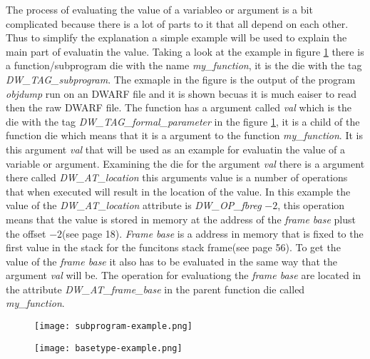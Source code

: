  


The process of evaluating the value of a variableo or argument is a bit complicated because there is a lot of parts to it that all depend on each other.
Thus to simplify the explanation a simple example will be used to explain the main part of evaluatin the value.
Taking a look at the example in figure \ref{fig:subprogramexample} there is a function/subprogram die with the name \emph{my\_function}, it is the die with the tag \emph{DW\_TAG\_subprogram}.
The exmaple in the figure is the output of the program \emph{objdump} run on an \gls{DWARF} file and it is shown becuas it is much eaiser to read then the raw \gls{DWARF} file.
The function has a argument called \emph{val} which is the die with the tag \emph{DW\_TAG\_formal\_parameter} in the figure \ref{fig:subprogramexample}, it is a child of the function die which means that it is a argument to the function \emph{my\_function}.
It is this argument \emph{val} that will be used as an example for evaluatin the value of a variable or argument.
Examining the die for the argument \emph{val} there is a argument there called \emph{DW\_AT\_location} this arguments value is a number of operations that when executed will result in the location of the value.
In this example the value of the \emph{DW\_AT\_location} attribute is \emph{DW\_OP\_fbreg} $-2$, this operation means that the value is stored in memory at the address of the \emph{frame base} plust the offset $-2$(see \cite{dwarf} page 18).
\emph{Frame base} is a address in memory that is fixed to the first value in the stack for the funcitons stack frame(see \cite{dwarf} page 56).
To get the value of the \emph{frame base} it also has to be evaluated in the same way that the argument \emph{val} will be.
The operation for evaluationg the \emph{frame base} are located in the attribute \emph{DW\_AT\_frame\_base} in the parent function die called \emph{my\_function}.



\begin{figure}[h]
    \centering
    \texttt{[image: subprogram-example.png]}
    \label{fig:subprogramexample}
\end{figure}


\begin{figure}[h]
    \centering
    \texttt{[image: basetype-example.png]}
    \label{fig:basetypeexample}
\end{figure}

